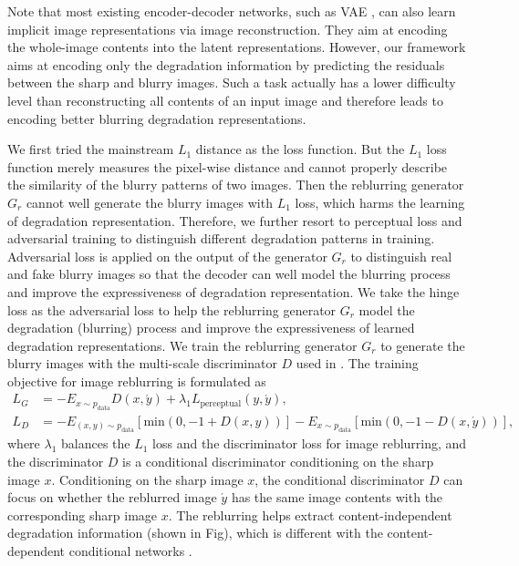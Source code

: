 \documentclass[runningheads]{llncs}
\begin{document}
Note that most existing encoder-decoder networks, such as VAE \cite{VAE}, can also learn implicit image representations via image reconstruction. They aim at encoding the whole-image contents into the latent representations. However, our framework aims at encoding only the degradation information by predicting the residuals between the sharp and blurry images. 
Such a task actually has a lower difficulty level than reconstructing all contents of an input image and therefore leads to encoding better blurring degradation representations.

We first tried the mainstream $L_1$ distance as the loss function. But the $L_1$ loss function merely measures the pixel-wise distance and cannot properly describe the similarity of the blurry patterns of two images. Then the reblurring generator $G_r$ cannot well generate the blurry images with $L_1$ loss, which harms the learning of degradation representation. 
Therefore, we further resort to perceptual loss \cite{Johnson2016Perceptual} and adversarial training \cite{GAN} to distinguish different degradation patterns in training. 
Adversarial loss is applied on the output of the generator $G_r$ to distinguish real and fake blurry images so that the decoder can well model the blurring process and improve the expressiveness of degradation representation.
We take the hinge loss \cite{lim2017geometric,SAGAN,SNGAN,park2019SPADE} as the adversarial loss to help the reblurring generator $G_r$ model the degradation (blurring) process and improve the expressiveness of learned degradation representations. We train the reblurring generator $G_r$ to generate the blurry images with the multi-scale discriminator $D$ used in \cite{wang2018pix2pixHD}. The training objective for image reblurring is formulated as 
\begin{equation}
\begin{aligned}
    L_G &= - E_{x\sim p_{\mathrm{data}}} D(x, \acute{y}) + \lambda_1 L_{\mathrm{perceptual}}(y,\acute{y}), \\
    L_D &= - E_{(x,y)\sim p_{\mathrm{data}}} [\mathrm{min}(0, -1 + D(x,y))] - E_{x\sim p_{\mathrm{data}}} [\mathrm{min} (0, -1-D(x, \acute{y}))],
\end{aligned}
\end{equation}
where $\lambda_1$ balances the $L_1$ loss and the discriminator loss for image reblurring, and the discriminator $D$ is a conditional discriminator conditioning on the sharp image $x$. 
Conditioning on the sharp image $x$, the conditional discriminator $D$ can focus on whether the reblurred image $\acute{y}$ has the same image contents with the corresponding sharp image $x$. 
The reblurring helps extract content-independent degradation information (shown in Fig), which is different with the content-dependent conditional networks \cite{wang2018sftgan,spatially_variant_recurrent,zhou2019stfan}.
\end{document}
